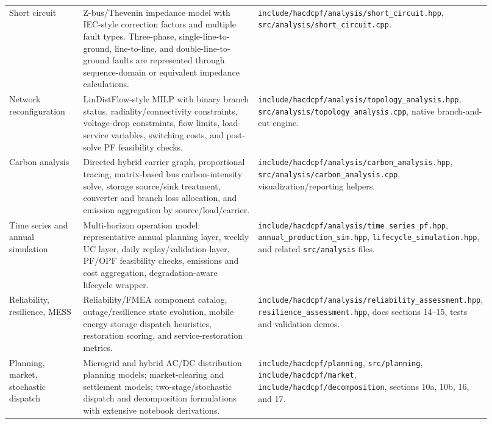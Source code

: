 \begin{longtable}{@{}L{0.16\linewidth}L{0.42\linewidth}L{0.34\linewidth}@{}}
Short circuit & Z-bus/Thevenin impedance model with IEC-style correction factors and multiple fault types.  Three-phase, single-line-to-ground, line-to-line, and double-line-to-ground faults are represented through sequence-domain or equivalent impedance calculations. & \texttt{include/hacdcpf/analysis/short\_circuit.hpp}, \texttt{src/analysis/short\_circuit.cpp}. \\
Network reconfiguration & LinDistFlow-style MILP with binary branch status, radiality/connectivity constraints, voltage-drop constraints, flow limits, load-service variables, switching costs, and post-solve PF feasibility checks. & \texttt{include/hacdcpf/analysis/topology\_analysis.hpp}, \texttt{src/analysis/topology\_analysis.cpp}, native branch-and-cut engine. \\
Carbon analysis & Directed hybrid carrier graph, proportional tracing, matrix-based bus carbon-intensity solve, storage source/sink treatment, converter and branch loss allocation, and emission aggregation by source/load/carrier. & \texttt{include/hacdcpf/analysis/carbon\_analysis.hpp}, \texttt{src/analysis/carbon\_analysis.cpp}, visualization/reporting helpers. \\
Time series and annual simulation & Multi-horizon operation model: representative annual planning layer, weekly UC layer, daily replay/validation layer, PF/OPF feasibility checks, emissions and cost aggregation, degradation-aware lifecycle wrapper. & \texttt{include/hacdcpf/analysis/time\_series\_pf.hpp}, \texttt{annual\_production\_sim.hpp}, \texttt{lifecycle\_simulation.hpp}, and related \texttt{src/analysis} files. \\
Reliability, resilience, MESS & Reliability/FMEA component catalog, outage/resilience state evolution, mobile energy storage dispatch heuristics, restoration scoring, and service-restoration metrics. & \texttt{include/hacdcpf/analysis/reliability\_assessment.hpp}, \texttt{resilience\_assessment.hpp}, docs sections 14--15, tests and validation demos. \\
Planning, market, stochastic dispatch & Microgrid and hybrid AC/DC distribution planning models; market-clearing and settlement models; two-stage/stochastic dispatch and decomposition formulations with extensive notebook derivations. & \texttt{include/hacdcpf/planning}, \texttt{src/planning}, \texttt{include/hacdcpf/market}, \texttt{include/hacdcpf/decomposition}, sections 10a, 10b, 16, and 17. \\
\bottomrule
\end{longtable}

